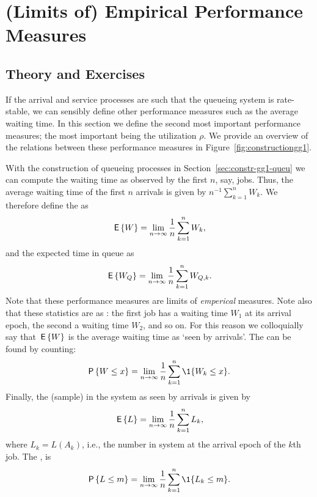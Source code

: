 \section{(Limits of) Empirical Performance Measures}
\label{sec:limits-of-emperical}


\subsection*{Theory and Exercises}


If the arrival and service processes are such that the queueing system
is rate-stable, we can sensibly define other performance measures such
as the average waiting time. In this section we define the second most
important performance measures; the most important being the
utilization $\rho$. We provide an overview of the relations between
these performance measures in Figure~\ref{fig:constructiongg1}.


With the construction of queueing processes in
Section~\ref{sec:constr-gg1-queu} we can compute the waiting time as
observed by the first $n$, say, jobs. Thus, the average waiting time
of the first $n$ arrivals is given by $n^{-1}\sum_{k=1}^n W_k$. We
therefore define the  as
\begin{equation}\label{eq:49}
  \,\mathsf{E}\left\{W\right\} = \lim_{n\to\infty} \frac 1n\sum_{k=1}^n W_k,
\end{equation}
and the expected time in queue as
\begin{equation}\label{eq:50}
  \,\mathsf{E}\left\{W_Q\right\} = \lim_{n\to\infty} \frac 1 n\sum_{k=1}^n W_{Q,k}.
\end{equation}
Note that these performance measures are limits of \emph{emperical}
measures.  Note also that these statistics are as : the first job has a waiting time $W_1$ at its
arrival epoch, the second a waiting time $W_2$, and so on. For this
reason we colloquially say that $\,\mathsf{E}\left\{W\right\}$ is the average waiting time as
`seen by arrivals'.  The  can be found by counting:
\begin{equation}\label{eq:48}
  \P{W \leq x}  = \lim_{n\to\infty} \frac 1n\sum_{k=1}^n \1{W_k\leq x}.
\end{equation}
Finally, the (sample)  in the system as seen by
arrivals is given by
\begin{equation}\label{eq:EQ}
\,\mathsf{E}\left\{L\right\} =  \lim_{n\to\infty}\frac 1 n \sum_{k=1}^n L_k,
\end{equation}
where $L_k = L(A_k)$, i.e., the number in system at the arrival epoch
of the $k$th job.  The , is
\begin{equation}\label{eq:Qm}
\P{L\leq m} = \lim_{n\to\infty} \frac 1 n \sum_{k=1}^n \1{L_k \leq m}.
\end{equation}


